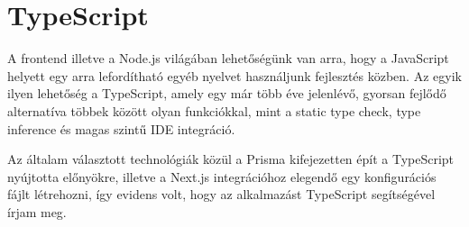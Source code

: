 \section{TypeScript}
A frontend illetve a Node.js világában lehetőségünk van arra, hogy a JavaScript helyett egy arra lefordítható
egyéb nyelvet használjunk fejlesztés közben. Az egyik ilyen lehetőség a TypeScript\cite{TypeScript}, amely egy már több éve jelenlévő,
gyorsan fejlődő alternatíva többek között olyan funkciókkal, mint a static type check, type inference és magas szintű IDE
integráció.

Az általam választott technológiák közül a Prisma kifejezetten épít a TypeScript nyújtotta előnyökre, illetve a Next.js
integrációhoz elegendő egy konfigurációs fájlt létrehozni, így evidens volt, hogy az alkalmazást TypeScript segítségével írjam meg.
